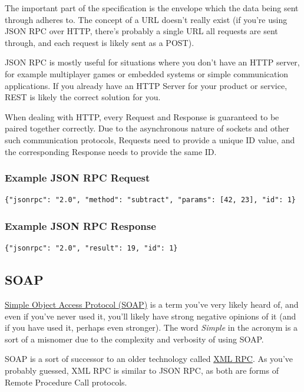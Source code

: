 \documentclass{book}
\begin{document}
The important part of the specification is the envelope which the data being sent through adheres to. The concept of a URL doesn't really exist (if you're using JSON RPC over HTTP, there's probably a single URL all requests are sent through, and each request is likely sent as a POST).

JSON RPC is mostly useful for situations where you don't have an HTTP server, for example multiplayer games or embedded systems or simple communication applications. If you already have an HTTP Server for your product or service, REST is likely the correct solution for you.

When dealing with HTTP, every Request and Response is guaranteed to be paired together correctly. Due to the asynchronous nature of sockets and other such communication protocols, Requests need to provide a unique ID value, and the corresponding Response needs to provide the same ID.

\subsubsection{Example JSON RPC Request}

\begin{verbatim}
{"jsonrpc": "2.0", "method": "subtract", "params": [42, 23], "id": 1}
\end{verbatim}

\subsubsection{Example JSON RPC Response}

\begin{verbatim}
{"jsonrpc": "2.0", "result": 19, "id": 1}
\end{verbatim}


\subsection{SOAP}

\href{https://en.wikipedia.org/wiki/SOAP}{Simple Object Access Protocol (SOAP)} \cite{SOAP} is a term you've very likely heard of, and even if you've never used it, you'll likely have strong negative opinions of it (and if you have used it, perhaps even stronger). The word \emph{Simple} in the acronym is a sort of a misnomer due to the complexity and verbosity of using SOAP.

SOAP is a sort of successor to an older technology called \href{https://en.wikipedia.org/wiki/XML-RPC}{XML RPC}. As you've probably guessed, XML RPC is similar to JSON RPC, as both are forms of Remote Procedure Call protocols.
\end{document}
